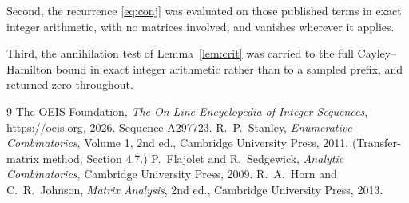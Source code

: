 \documentclass[11pt,a4paper]{article}
\theoremstyle{plain}
\theoremstyle{definition}
\begin{document}
Second, the recurrence \eqref{eq:conj} was evaluated on those published terms in exact
integer arithmetic, with no matrices involved, and vanishes wherever it applies.

Third, the annihilation test of Lemma~\ref{lem:crit} was carried to the full
Cayley--Hamilton bound in exact integer arithmetic rather than to a sampled prefix, and
returned zero throughout.

\begin{thebibliography}{9}
 The OEIS Foundation, \emph{The On-Line Encyclopedia of Integer
Sequences}, \url{https://oeis.org}, 2026. Sequence A297723.
 R.~P.~Stanley, \emph{Enumerative Combinatorics}, Volume 1, 2nd ed.,
Cambridge University Press, 2011. (Transfer-matrix method, Section 4.7.)
 P.~Flajolet and R.~Sedgewick, \emph{Analytic Combinatorics}, Cambridge
University Press, 2009.
 R.~A.~Horn and C.~R.~Johnson, \emph{Matrix Analysis}, 2nd ed., Cambridge
University Press, 2013.
\end{thebibliography}
\end{document}
